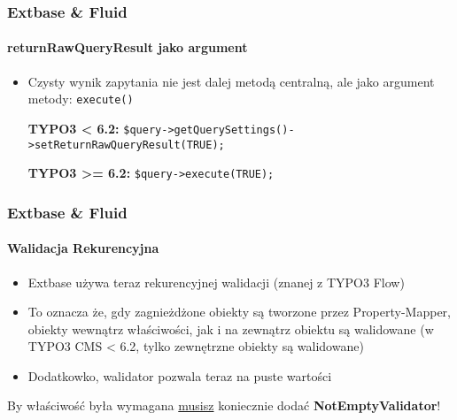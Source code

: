 
\begin{frame}[fragile]
	\frametitle{Extbase \& Fluid}
	\framesubtitle{returnRawQueryResult jako argument}

	\lstset{
		basicstyle=\smaller\ttfamily
	}

	\begin{itemize}
		\item Czysty wynik zapytania nie jest dalej metodą centralną,\newline
			ale jako argument metody: \texttt{execute()}
			\newline

			\smaller\textbf{TYPO3 < 6.2:}\normalsize\newline
			\lstinline!$query->getQuerySettings()->setReturnRawQueryResult(TRUE);!
			\newline

			\smaller\textbf{TYPO3 >= 6.2:}\normalsize\newline
			\lstinline!$query->execute(TRUE);!

	\end{itemize}

\end{frame}


\begin{frame}[fragile]
	\frametitle{Extbase \& Fluid}
	\framesubtitle{Walidacja Rekurencyjna}

	\begin{itemize}
		\item Extbase używa teraz rekurencyjnej walidacji (znanej z TYPO3 Flow)
		\item To oznacza że, gdy zagnieżdżone obiekty są tworzone przez Property-Mapper, obiekty wewnątrz właściwości, jak i na zewnątrz obiektu są
		walidowane\newline
			(w TYPO3 CMS < 6.2, tylko zewnętrzne obiekty są walidowane)
		\item Dodatkowko, walidator pozwala teraz na puste wartości
	\end{itemize}

	\breakingchange

	\smaller\begin{center} By właściwość była wymagana \underline{musisz} koniecznie dodać \textbf{NotEmptyValidator}!\end{center}\normalsize

\end{frame}

